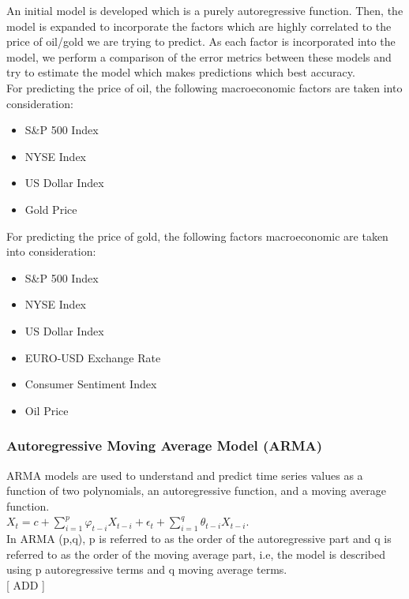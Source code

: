 \documentclass[runningheads]{llncs}
\begin{document}
\noindent An initial model is developed which is a purely autoregressive function. Then, the model is expanded to incorporate the factors which are highly correlated to the price of oil/gold we are trying to predict. As each factor is incorporated into the model, we perform a comparison of the error metrics between these models and try to estimate the model which makes predictions which best accuracy.\\

For predicting the price of oil, the following macroeconomic factors are taken into consideration:
\begin {itemize}
\item S\&P 500 Index
\item NYSE Index
\item US Dollar Index
\item Gold Price
\end {itemize}

For predicting the price of gold, the following factors macroeconomic are taken into consideration:
\begin {itemize}
\item S\&P 500 Index
\item NYSE Index
\item US Dollar Index
\item EURO-USD Exchange Rate
\item Consumer Sentiment Index
\item Oil Price
\end {itemize}


\subsubsection{Autoregressive Moving Average Model (ARMA)}
ARMA models are used to understand and predict time series values as a function of two polynomials, an autoregressive function, and a moving average function. 
\\

$ X_{t} = c + \sum\limits_{i=1}^p \varphi_{t-i}X_{t-i} + \epsilon_{t} + \sum\limits_{i=1}^q \theta_{t-i}X_{t-i}$.\\

In ARMA (p,q), p is referred to as the order of the autoregressive part and q is referred to as the order of the moving average part, i.e, the model is described using p autoregressive terms and q moving average terms.\\ 

[ ADD ]
\end{document}
